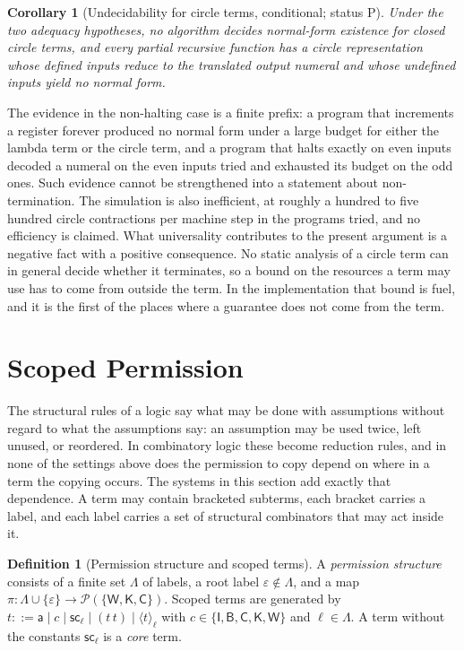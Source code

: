 \documentclass[11pt]{article}
\newtheorem{corollary}[theorem]{Corollary}
\theoremstyle{definition}
\newtheorem{definition}[theorem]{Definition}
\theoremstyle{remark}
\newcommand{\cI}{\mathsf{I}}
\newcommand{\cB}{\mathsf{B}}
\newcommand{\cC}{\mathsf{C}}
\newcommand{\cK}{\mathsf{K}}
\newcommand{\cW}{\mathsf{W}}
\newcommand{\br}[2]{\langle #1\rangle_{#2}}
\newcommand{\sca}[1]{\mathsf{sc}_{#1}}
\newcommand{\Perm}{\mathcal{P}}
\newcommand{\Pt}{status P}
\begin{document}
\begin{corollary}[Undecidability for circle terms, conditional; \Pt]\label{cor:undec}
Under the two adequacy hypotheses, no algorithm decides normal-form existence for closed circle terms, and every partial recursive function has a circle representation whose defined inputs reduce to the translated output numeral and whose undefined inputs yield no normal form.
\end{corollary}

The evidence in the non-halting case is a finite prefix: a program that increments a register forever produced no normal form under a large budget for either the lambda term or the circle term, and a program that halts exactly on even inputs decoded a numeral on the even inputs tried and exhausted its budget on the odd ones. Such evidence cannot be strengthened into a statement about non-termination. The simulation is also inefficient, at roughly a hundred to five hundred circle contractions per machine step in the programs tried, and no efficiency is claimed. What universality contributes to the present argument is a negative fact with a positive consequence. No static analysis of a circle term can in general decide whether it terminates, so a bound on the resources a term may use has to come from outside the term. In the implementation that bound is fuel, and it is the first of the places where a guarantee does not come from the term.


\section{Scoped Permission}\label{sec:scoped}

The structural rules of a logic say what may be done with assumptions without regard to what the assumptions say: an assumption may be used twice, left unused, or reordered. In combinatory logic these become reduction rules, and in none of the settings above does the permission to copy depend on where in a term the copying occurs. The systems in this section add exactly that dependence. A term may contain bracketed subterms, each bracket carries a label, and each label carries a set of structural combinators that may act inside it.

\begin{definition}[Permission structure and scoped terms]
A \emph{permission structure} consists of a finite set $\Lambda$ of labels, a root label $\varepsilon\notin\Lambda$, and a map $\pi:\Lambda\cup\{\varepsilon\}\to\Perm(\{\cW,\cK,\cC\})$. Scoped terms are generated by $t::=\mathsf a\mid c\mid\sca\ell\mid(t\,t)\mid\br t\ell$ with $c\in\{\cI,\cB,\cC,\cK,\cW\}$ and $\ell\in\Lambda$. A term without the constants $\sca\ell$ is a \emph{core} term.
\end{definition}
\end{document}
